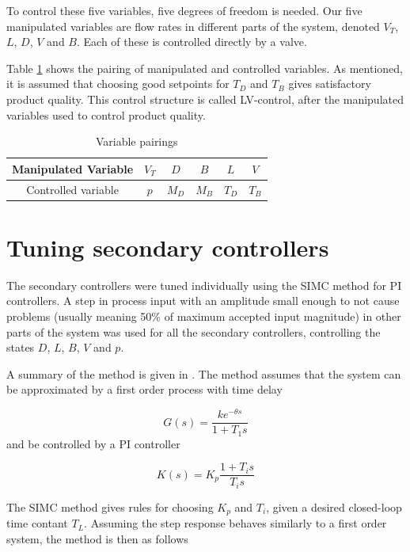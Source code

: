 \documentclass[12pt]{article}
\begin{document}
To control these five variables, five degrees of freedom is needed. Our five manipulated variables are flow rates in different parts of the system, denoted $V_T$, $L$, $D$, $V$ and $B$. Each of these is controlled directly by a valve. 

Table \ref{tab:pairings} shows the pairing of manipulated and controlled variables. As mentioned, it is assumed that choosing good setpoints for $T_D$ and $T_B$ gives satisfactory product quality. This control structure is called LV-control, after the manipulated variables used to control product quality.

\begin{table}[h]
\centering
\begin{tabular}{c|ccccc}
Manipulated Variable & $V_T$ & $D$ & $B$ & $L$ & $V$ \\ \hline
Controlled variable & $p$ & $M_D$ & $M_B$ & $T_D$ & $T_B$
\end{tabular}

\caption{Variable pairings}
\label{tab:pairings}
\end{table}

\newpage
\section{Tuning secondary controllers}
The secondary controllers were tuned individually using the SIMC method for PI controllers. A step in process input with an amplitude small enough to not cause problems (usually meaning 50\% of maximum accepted input magnitude) in other parts of the system was used for all the secondary controllers, controlling the states $D$, $L$, $B$, $V$ and $p$.

A summary of the method is given in \cite{regtek}. The method assumes that the system can be approximated by a first order process with time delay

\begin{equation}
G(s) = \frac{k e^{-\theta s}}{1 + T_1 s}
\end{equation}
and be controlled by a PI controller

\begin{equation}
K(s) = K_p\frac{1 + T_i s}{T_i s}
\end{equation}

The SIMC method gives rules for choosing $K_p$ and $T_i$, given a desired closed-loop time contant $T_L$. Assuming the step response behaves similarly to a first order system, the method is then as follows
\end{document}
